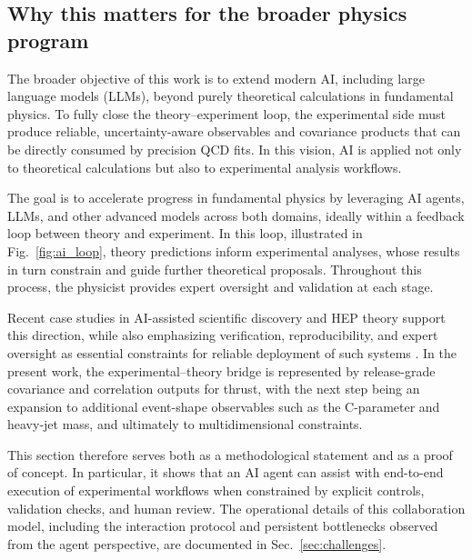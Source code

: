 \subsection{Why this matters for the broader physics program}

The broader objective of this work is to extend modern AI, including large
language models (LLMs), beyond purely theoretical calculations in
fundamental physics. To fully close the theory--experiment loop, the
experimental side must produce reliable, uncertainty-aware observables and
covariance products that can be directly consumed by precision QCD fits.
In this vision, AI is applied not only to theoretical calculations but also
to experimental analysis workflows.

The goal is to accelerate progress in fundamental physics by leveraging AI
agents, LLMs, and other advanced models across both domains, ideally within
a feedback loop between theory and experiment. In this loop, illustrated in
Fig.~\ref{fig:ai_loop}, theory predictions inform experimental analyses,
whose results in turn constrain and guide further theoretical proposals.
Throughout this process, the physicist provides expert oversight and
validation at each stage.

Recent case studies in AI-assisted scientific discovery and HEP theory
support this direction, while also emphasizing verification,
reproducibility, and expert oversight as essential constraints
for reliable deployment of such systems
\cite{Woodruff:2026practicalsi,Bubeck:2025coscientist,OpenAITheory:2026singleminus,Schwartz:2026cparameterllm}.
In the present work, the experimental--theory bridge is represented by
release-grade covariance and correlation outputs for thrust, with the next
step being an expansion to additional event-shape observables such as the
C-parameter and heavy-jet mass, and ultimately to multidimensional
constraints.

This section therefore serves both as a methodological statement and as a proof of concept. In particular, it shows that an AI agent can
assist with end-to-end execution of experimental workflows when constrained
by explicit controls, validation checks, and human review. The operational
details of this collaboration model, including the interaction protocol and
persistent bottlenecks observed from the agent perspective, are documented
in Sec.~\ref{sec:challenges}.